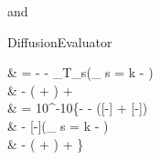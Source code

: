 and
\begin{equationCode}{DiffusionEvaluator}
\begin{split}
 & = - %
                                  - \thermcoef_{T_s}\left(_{ s = k} -   \right) \\
                              & \fakeequalspace   
                                  - \left( + \right)
                                  +  \\[10pt]
\uu\frac{[km\,s^{-1}]}{[cm^{-3}]} & \uu = 10^{-10}\Bigg\{- \frac{[cm^2\,s^{-1}]}{[cm^{-3}]}\frac{[-]}{[km]}
                                  - \frac{[cm^2\,s^{-1}]}{[cm^{-3}]}\frac{[-]}{[K]}\frac{[K]}{[km]}\left([-] + \frac{[cm^{-3}] - [cm^{-3}]}{[cm^{-3}]}[-]\right) \\
                              & \uu \fakeequalspace
                                  - \frac{[cm^2\,s^{-1}]}{[K]}\frac{[K]}{[km]}[-]\left(\underbrace{\uu\frac{[-]}{[cm^{-3}]}}_{ s = k} -   \right) \\
                              & \uu \fakeequalspace
                                  - \frac{[cm^2\,s^{-1}]}{[cm^{-3}]}\left(\frac{[-]}{[km]} + \frac{[-]}{[K]}\frac{[K]}{[km]}\right)
                                  + \frac{[km]}{[cm^{-3}]}  \Bigg\}
\end{split}
\end{equationCode}
